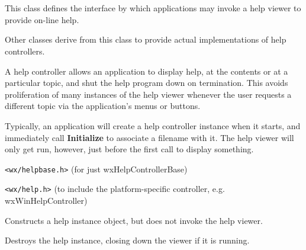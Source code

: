 \section{}\label{wxhelpcontrollerbase}

This class defines the interface by which
applications may invoke a help viewer to provide on-line help.

Other classes derive from this class to provide actual implementations
of help controllers.

A help controller allows an application to display help, at the contents
or at a particular topic, and shut the help program down on termination.
This avoids proliferation of many instances of the help viewer whenever the
user requests a different topic via the application's menus or buttons.

Typically, an application will create a help controller instance
when it starts, and immediately call {\bf Initialize}\rtfsp
to associate a filename with it. The help viewer will only get run, however,
just before the first call to display something.






{\tt <wx/helpbase.h>} (for just wxHelpControllerBase)

{\tt <wx/help.h>} (to include the platform-specific controller, e.g. wxWinHelpController)





Constructs a help instance object, but does not invoke the help viewer.



Destroys the help instance, closing down the viewer if it is running.

\label{wxhelpcontrollerbaseinitialize}


